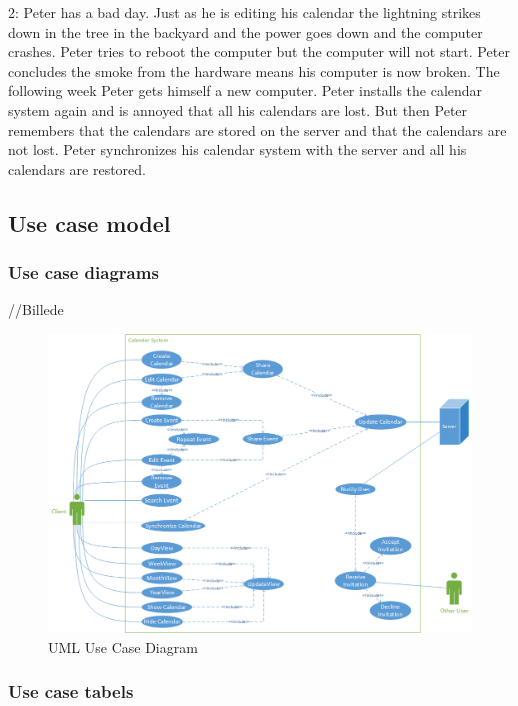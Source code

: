 2:
Peter has a bad day. Just as he is editing his calendar the lightning strikes down in the tree in the backyard and the power goes down and the computer crashes. Peter tries to reboot the computer but the computer will not start. Peter concludes the smoke from the hardware means his computer is now broken. The following week Peter gets himself a new computer. Peter installs the calendar system again and is annoyed that all his calendars are lost. But then Peter remembers that the calendars are stored on the server and that the calendars are not lost.
Peter synchronizes his calendar system with the server and all his calendars are restored.

\pagebreak

\subsection*{Use case model}

\subsubsection{Use case diagrams}

//Billede
\begin{figure}[ht!]
\centering
\includegraphics[width=160mm]{usecase.png}
\caption{UML Use Case Diagram \label{overflow}}
\end{figure}

\pagebreak

\subsubsection{Use case tabels}

